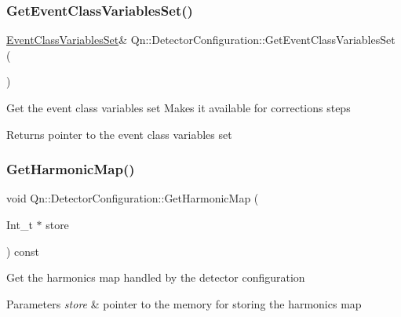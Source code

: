 \subsubsection{\texorpdfstring{Get\+Event\+Class\+Variables\+Set()}{GetEventClassVariablesSet()}}
{\footnotesize\ttfamily \mbox{\hyperlink{classQn_1_1EventClassVariablesSet}{Event\+Class\+Variables\+Set}}\& Qn\+::\+Detector\+Configuration\+::\+Get\+Event\+Class\+Variables\+Set (\begin{DoxyParamCaption}{ }\end{DoxyParamCaption})\hspace{0.3cm}{\ttfamily [inline]}}

Get the event class variables set Makes it available for corrections steps \begin{DoxyReturn}{Returns}
pointer to the event class variables set 
\end{DoxyReturn}
\mbox{\label{classQn_1_1DetectorConfiguration_a3e8079b295c46564e525072dab4ae055}} 
\subsubsection{\texorpdfstring{Get\+Harmonic\+Map()}{GetHarmonicMap()}}
{\footnotesize\ttfamily void Qn\+::\+Detector\+Configuration\+::\+Get\+Harmonic\+Map (\begin{DoxyParamCaption}\item[{Int\+\_\+t $\ast$}]{store }\end{DoxyParamCaption}) const\hspace{0.3cm}{\ttfamily [inline]}}

Get the harmonics map handled by the detector configuration 
\begin{DoxyParams}{Parameters}
{\em store} & pointer to the memory for storing the harmonics map \\
\hline
\end{DoxyParams}
\mbox{\label{classQn_1_1DetectorConfiguration_a80b18020e8636295cdea1dd2c11449d3}} 
